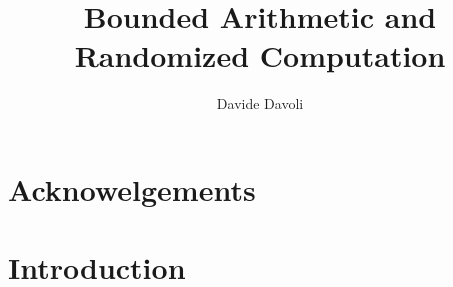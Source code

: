 \documentclass[10pt]{book}
\title{Bounded Arithmetic and Randomized Computation}
\author{Davide Davoli}
\begin{document}



\def\level{\lextended}

\chapter*{Acknowelgements}


\tableofcontents

\chapter*{Introduction}

\end{document}
